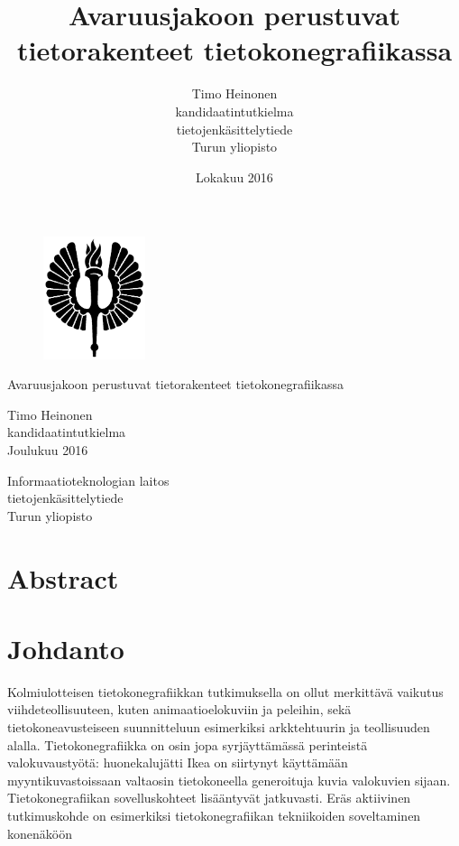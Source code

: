 \documentclass[a4paper,12pt, titlepage]{article}
\title{Avaruusjakoon perustuvat tietorakenteet tietokonegrafiikassa}
\author{Timo Heinonen \\kandidaatintutkielma \\ tietojenkäsittelytiede \\ Turun yliopisto}
\date{Lokakuu 2016}
\theoremstyle{break}
\begin{document}
\thispagestyle{empty}
\begin{figure}
\includegraphics[width=3cm]{soihtu.png}
\vspace{4.0cm}
\end{figure}


\begin{center}\Large
Avaruusjakoon perustuvat tietorakenteet tietokonegrafiikassa
\end{center}

\begin{center}
Timo Heinonen\\
kandidaatintutkielma\\
Joulukuu 2016
\end{center}

\begin{center}
Informaatioteknologian laitos\\
tietojenkäsittelytiede\\
Turun yliopisto\\
\end{center}

\begin{figure}[b]
\vspace*{-5.0cm}
\end{figure}

\newpage
{}%
\thispagestyle{empty}
\section*{Abstract}
\newpage

\setcounter{tocdepth}{2} %
\tableofcontents

\newpage
\section{Johdanto}

Kolmiulotteisen tietokonegrafiikkan tutkimuksella on ollut merkittävä vaikutus viihdeteollisuuteen, kuten animaatioelokuviin ja peleihin, sekä tietokoneavusteiseen suunnitteluun esimerkiksi arkktehtuurin ja teollisuuden alalla.  Tietokonegrafiikka on osin jopa syrjäyttämässä perinteistä valokuvaustyötä: huonekalujätti Ikea on siirtynyt käyttämään myyntikuvastoissaan valtaosin tietokoneella generoituja kuvia valokuvien sijaan.\cite{ikea} Tietokonegrafiikan sovelluskohteet lisääntyvät jatkuvasti. Eräs aktiivinen tutkimuskohde on esimerkiksi tietokonegrafiikan tekniikoiden soveltaminen konenäköön \cite{hughes}\\
\end{document}
